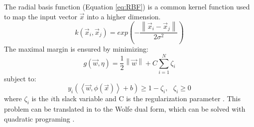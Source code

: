 The radial basis function (Equation \ref{eq:RBF}) is a common kernel function used to map the input vector $\vec{x}$ into a higher dimension.
\begin{equation}
\label{eq:RBF}
k \left ( \vec{x}_i , \vec{x}_j \right ) = exp \left ( - \frac{\left \| \vec{x}_i - \vec{x}_j \right \|}{2\sigma^2} \right ) 
\end{equation}
The maximal margin is ensured by minimizing:
\begin{equation}
\label{eq:Min}
g(\vec{w},\eta) = \frac{1}{2} \left \| \vec{w} \right \| + C \sum_{i=1}^N \zeta_i
\end{equation}
subject to:
\begin{equation}
\label{eq:Constraint}
y_i( \left \langle \vec{w},\phi(\vec{x}) \right \rangle + b ) \ge 1-\zeta_i, ~~~\zeta_i \ge 0
\end{equation}
where $\zeta_i$ is the $i$th slack variable and C is the regularization parameter \cite{li_adaboost_2008}.
This problem can be translated  in to the Wolfe dual form, which can be solved with quadratic programing \cite{li_adaboost_2008}.

